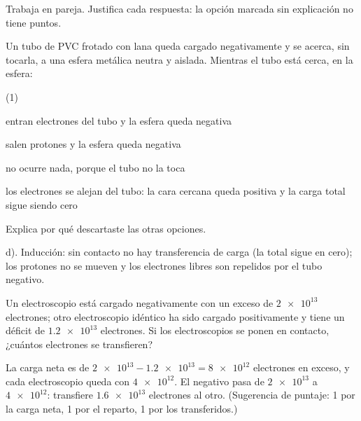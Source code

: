 \documentclass[11pt]{article}
\begin{document}
\encabezado

\begin{instrucciones}
Trabaja en pareja. Justifica cada respuesta: la opción marcada sin explicación no tiene
puntos.
\end{instrucciones}

\begin{preguntas}

\pregunta[2] Un tubo de PVC frotado con lana queda cargado negativamente y se acerca, sin
tocarla, a una esfera metálica neutra y aislada. Mientras el tubo está cerca, en la esfera:
\begin{opciones*}(1)
  \item entran electrones del tubo y la esfera queda negativa
  \item salen protones y la esfera queda negativa
  \item no ocurre nada, porque el tubo no la toca
  \item los electrones se alejan del tubo: la cara cercana queda positiva y la carga total
        sigue siendo cero
\end{opciones*}
Explica por qué descartaste las otras opciones.
\begin{solucion}[3.5cm]
d). Inducción: sin contacto no hay transferencia de carga (la total sigue en cero); los
protones no se mueven y los electrones libres son repelidos por el tubo negativo.
\end{solucion}

\pregunta[3] Un electroscopio está cargado negativamente con un exceso de $\num{2e13}$
electrones; otro electroscopio idéntico ha sido cargado positivamente y tiene un déficit de
$\num{1,2e13}$ electrones. Si los electroscopios se ponen en contacto, ¿cuántos electrones se
transfieren?
\begin{solucion}[5cm]
La carga neta es de $\num{2e13} - \num{1,2e13} = \num{8e12}$ electrones en exceso, y cada
electroscopio queda con $\num{4e12}$. El negativo pasa de $\num{2e13}$ a $\num{4e12}$:
transfiere $\num{1,6e13}$ electrones al otro.
(Sugerencia de puntaje: 1 por la carga neta, 1 por el reparto, 1 por los transferidos.)
\end{solucion}

\end{preguntas}
\end{document}
